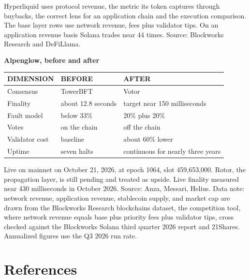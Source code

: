 \documentclass[11pt]{article}
\begin{document}
{\footnotesize\color{mid} Hyperliquid uses protocol revenue, the metric its token captures through buybacks, the correct lens for an application chain and the execution comparison. The base layer rows use network revenue, fees plus validator tips. On an application revenue basis Solana trades near 44 times. Source: Blockworks Research and DeFiLlama.}

\vspace{10pt}
{\small\sffamily\color{mid}\textbf{Alpenglow, before and after}}
\vspace{-2pt}

\begin{center}
\begin{tabular}{@{}lll@{}}
\toprule
{\sffamily\footnotesize\color{mid}DIMENSION} & {\sffamily\footnotesize\color{mid}BEFORE} & {\sffamily\footnotesize\color{mid}AFTER} \\
\midrule
Consensus & TowerBFT & Votor \\
Finality & about 12.8 seconds & target near 150 milliseconds \\
Fault model & below 33\% & 20\% plus 20\% \\
Votes & on the chain & off the chain \\
Validator cost & baseline & about 60\% lower \\
Uptime & seven halts & continuous for nearly three years \\
\bottomrule
\end{tabular}
\end{center}

{\footnotesize\color{mid} Live on mainnet on October 21, 2026, at epoch 1064, slot 459,653,000. Rotor, the propagation layer, is still pending and treated as upside. Live finality measured near 430 milliseconds in October 2026. Source: Anza, Messari, Helius. Data note: network revenue, application revenue, stablecoin supply, and market cap are drawn from the Blockworks Research blockchains dataset, the competition tool, where network revenue equals base plus priority fees plus validator tips, cross checked against the Blockworks Solana third quarter 2026 report and 21Shares. Annualized figures use the Q3 2026 run rate.}

\section*{References}
\end{document}
